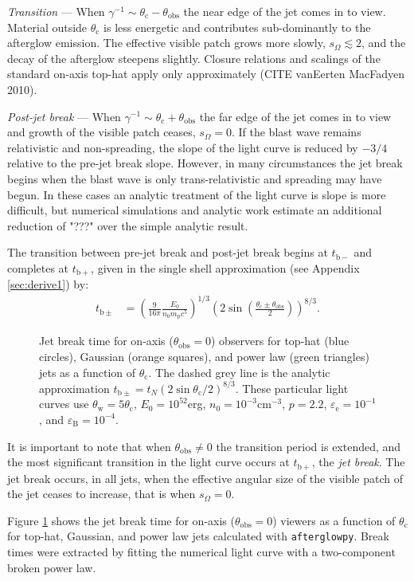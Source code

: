 \documentclass[twocolumn]{aastex62}
\newcommand{\afterglowpy}{{\tt afterglowpy}}
\newcommand{\tbm}{\ensuremath{t_{\mathrm{b-}}}}
\newcommand{\tbp}{\ensuremath{t_{\mathrm{b+}}}}
\newcommand{\tbpm}{\ensuremath{t_{\mathrm{b\pm}}}}
\newcommand{\thobs}{\ensuremath{\theta_{\mathrm{obs}}}}
\newcommand{\thW}{\ensuremath{\theta_{\mathrm{w}}}}
\newcommand{\thC}{\ensuremath{\theta_{\mathrm{c}}}}
\newcommand{\epse}{\ensuremath{\varepsilon_{\mathrm{e}}}}
\newcommand{\epsB}{\ensuremath{\varepsilon_{\mathrm{B}}}}
\newcommand{\Mp}{\ensuremath{m_{\mathrm{p}}}}
\newcommand{\som}{\ensuremath{s_{\Omega}}}
\begin{document}
\emph{Transition} ---  When $\gamma^{-1} \sim \thC-\thobs$ the near edge of the jet comes in to view.  Material outside $\thC$ is less energetic and contributes sub-dominantly to the afterglow emission.  The effective visible patch grows more slowly, $\som \lesssim 2$, and the decay of the afterglow steepens slightly. Closure relations and scalings of the standard on-axis top-hat apply only approximately (CITE vanEerten MacFadyen 2010).  

\emph{Post-jet break} ---  When $\gamma^{-1} \sim \thC+\thobs$ the far edge of the jet comes in to view and growth of the visible patch ceases, $\som = 0$.  If the blast wave remains relativistic and non-spreading, the slope of the light curve is reduced by $-3/4$ relative to the pre-jet break slope.  However, in many circumstances the jet break begins when the blast wave is only trans-relativistic and spreading may have begun.  In these cases an analytic treatment of the light curve is slope is more difficult, but numerical simulations and analytic work estimate an additional reduction of "???" over the simple analytic result.

The transition between pre-jet break and post-jet break begins at $\tbm$ and completes at $\tbp$, given in the single shell approximation (see Appendix \ref{sec:derive1}) by:
\begin{align}
	\tbpm &= \left(\frac{9}{16\pi} \frac{E_0}{n_0 \Mp c^5}\right)^{1/3} \left( 2 \sin \left(\frac{\thC\pm\thobs}{2}\right)\right)^{8/3} .\label{eq:tbpm}
\end{align}
\begin{figure}
	\caption{Jet break time for on-axis ($\thobs=0$) observers for top-hat (blue circles), Gaussian (orange squares), and power law (green triangles) jets as a function of $\thC$. The dashed grey line is the analytic approximation $\tbpm = t_N (2\sin \thC/2)^{8/3}$. These particular light curves use $\thW = 5 \thC$, $E_0 = 10^{52}$erg, $n_0=10^{-3}$cm$^{-3}$, $p=2.2$, $\epse = 10^{-1}$, and $\epsB = 10^{-4}$. \label{fig:tbOA}}
\end{figure}

It is important to note that when $\thobs \neq 0$ the transition period is extended, and the most significant transition in the light curve occurs at $\tbp$, the \emph{jet break}.  The jet break occurs, in all jets, when the effective angular size of the visible patch of the jet ceases to increase, that is when $\som = 0$.  

Figure \ref{fig:tbOA} shows the jet break time for on-axis ($\thobs = 0$) viewers as a function of $\thC$ for top-hat, Gaussian, and power law jets calculated with \afterglowpy{}. Break times were extracted by fitting the numerical light curve with a two-component broken power law.
\end{document}

